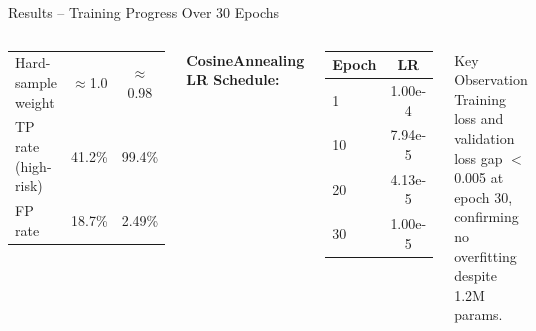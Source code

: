 \documentclass[aspectratio=169]{beamer}
\begin{document}
\begin{frame}{Results -- Training Progress Over 30 Epochs}
\begin{columns}[T]
\begin{center}
\begin{tabular}{@{}lcc@{}}
        Hard-sample weight & $\approx$1.0 & $\approx$0.98 \\
        TP rate (high-risk) & 41.2\% & 99.4\% \\
        FP rate             & 18.7\% & 2.49\% \\
        \bottomrule
      \end{tabular}
      \end{center}
      \vspace{0.2em}
      \textbf{CosineAnnealing LR Schedule:}
      \begin{center}\scriptsize
      \begin{tabular}{@{}lc@{}}
        \toprule
        \textbf{Epoch} & \textbf{LR} \\
        \midrule
        1  & 1.00e-4 \\
        10 & 7.94e-5 \\
        20 & 4.13e-5 \\
        30 & 1.00e-5 \\
        \bottomrule
      \end{tabular}
      \end{center}
      \begin{block}{Key Observation}
        Training loss and validation loss gap $<$0.005 at
        epoch 30, confirming no overfitting despite 1.2M params.
      \end{block}
  \end{columns}
\end{frame}
\end{document}
